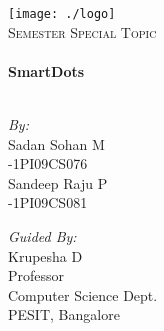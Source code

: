 
\begin{titlepage}
\begin{center}
\newpage


\texttt{[image: ./logo]}\\[3cm]    

\textsc{\Large  {} Semester Special Topic}\\[3cm]

\HRule \\[0.4cm]
{ \huge \bfseries SmartDots}\\[0.4cm]
\HRule \\[1.5cm]

\vspace{1in}

\begin{minipage}{0.4\textwidth}
\begin{flushleft} \large
\emph{By:}\\
Sadan Sohan M\\
-1PI09CS076\\
Sandeep Raju P\\
-1PI09CS081
\end{flushleft}
\end{minipage}
\begin{minipage}{0.4\textwidth}
\begin{flushright} \large
\emph{Guided By:} \\
Krupesha D\\
Professor \\
Computer Science Dept.\\
PESIT, Bangalore 
\end{flushright}
\end{minipage}

\vfill
\end{center}
\end{titlepage}
